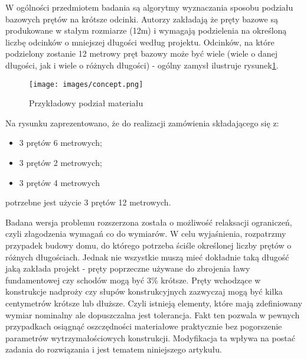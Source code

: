 W ogólności przedmiotem badania są algorytmy wyznaczania sposobu podziału bazowych prętów na krótsze odcinki. Autorzy zakładają że pręty bazowe są produkowane w stałym rozmiarze (12m) i wymagają podzielenia na określoną liczbę odcinków o mniejszej długości według projektu. Odcinków, na które podzielony zostanie 12 metrowy pręt bazowy może być wiele (wiele o danej długości, jak i wiele o różnych długości) - ogólny zamysł ilustruje rysunek\ref{fig:concept}. 

\begin{figure}[h]
    \centering
    \texttt{[image: images/concept.png]}
    \caption{Przykładowy podział materiału}
    \label{fig:concept}
\end{figure}

Na rysunku zaprezentowano, że do realizacji zamówienia składającego się z:
\begin{itemize}
\item 3 prętów 6 metrowych;
\item 3 prętów 2 metrowych;
\item 3 prętów 4 metrowych
\end{itemize}
potrzebne jest użycie 3 prętów 12 metrowych.

Badana wersja problemu rozszerzona została o możliwość relaksacji ograniczeń, czyli złagodzenia wymagań co do wymiarów. W celu wyjaśnienia, rozpatrzmy przypadek budowy domu, do którego potrzeba ściśle określonej liczby prętów o różnych długościach. Jednak nie wszystkie muszą mieć dokładnie taką długość jaką zakłada projekt - pręty poprzeczne używane do zbrojenia ławy fundamentowej czy schodów mogą być 3\% krótsze. Pręty wchodzące w konstrukcje nadproży czy słupów konstrukcyjnych zazwyczaj mogą być kilka centymetrów krótsze lub dłuższe. Czyli istnieją elementy, które mają zdefiniowany wymiar nominalny ale dopuszczalna jest tolerancja. Fakt ten pozwala w pewnych przypadkach osiągnąć oszczędności materiałowe praktycznie bez pogorszenie parametrów wytrzymałościowych konstrukcji. Modyfikacja ta wpływa na postać zadania do rozwiązania i jest tematem niniejszego artykułu.





